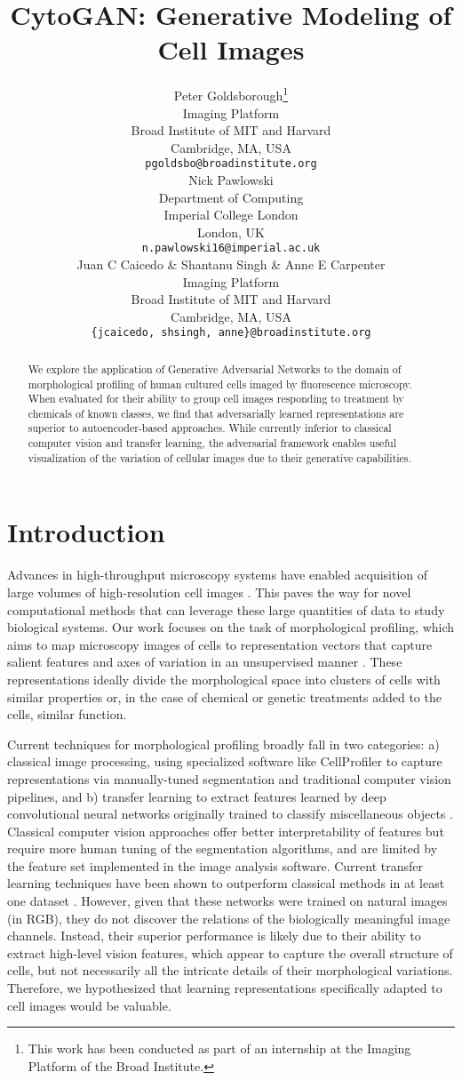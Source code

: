 \documentclass{article}
\title{CytoGAN: Generative Modeling of Cell Images}
\author{
  Peter Goldsborough\thanks{This work has been conducted as part of an internship at the Imaging Platform of the Broad Institute.}\\
  Imaging Platform \\
  Broad Institute of MIT and Harvard \\
  Cambridge, MA, USA \\
  \texttt{pgoldsbo@broadinstitute.org} \\
  \And
  Nick Pawlowski \\
  Department of Computing \\
  Imperial College London \\
  London, UK \\
  \texttt{n.pawlowski16@imperial.ac.uk} \\
  \AND
  Juan C Caicedo \& Shantanu Singh \& Anne E Carpenter\\
  Imaging Platform \\
  Broad Institute of MIT and Harvard \\
  Cambridge, MA, USA \\
  \texttt{\{jcaicedo, shsingh, anne\}@broadinstitute.org} \\
}
\begin{document}
\maketitle

\begin{abstract}
We explore the application of Generative Adversarial Networks to the domain of morphological profiling of human cultured cells imaged by fluorescence microscopy. When evaluated for their ability to group cell images responding to treatment by chemicals of known classes, we find that adversarially learned representations are superior to autoencoder-based approaches. While currently inferior to classical computer vision and transfer learning, the adversarial framework enables useful visualization of the variation of cellular images due to their generative capabilities.
\end{abstract}

\section{Introduction}
Advances in high-throughput microscopy systems have enabled acquisition of large volumes of high-resolution cell images \cite{caicedo2017data}. This paves the way for novel computational methods that can leverage these large quantities of data to study biological systems. Our work focuses on the task of morphological profiling, which aims to map microscopy images of cells to representation vectors that capture salient features and axes of variation in an unsupervised manner \cite{caicedo_profiling}. These representations ideally divide the morphological space into clusters of cells with similar properties or, in the case of chemical or genetic treatments added to the cells, similar function.

Current techniques for morphological profiling broadly fall in two categories: a) classical image processing, using specialized software like CellProfiler \cite{Carpenter2006} to capture representations via manually-tuned segmentation and traditional computer vision pipelines, and b) transfer learning to extract features learned by deep convolutional neural networks originally trained to classify miscellaneous objects \cite{pawlowski2016automating, ando2017improving}. Classical computer vision approaches offer better interpretability of features but require more human tuning of the segmentation algorithms, and are limited by the feature set implemented in the image analysis software. Current transfer learning techniques have been shown to outperform classical methods in at least one dataset \cite{pawlowski2016automating,ando2017improving}. However, given that these networks were trained on natural images (in RGB), they do not discover the relations of the biologically meaningful image channels. Instead, their superior performance is likely due to their ability to extract high-level vision features, which appear to capture the overall structure of cells, but not necessarily all the intricate details of their morphological variations. Therefore, we hypothesized that learning representations specifically adapted to cell images would be valuable.
\end{document}
